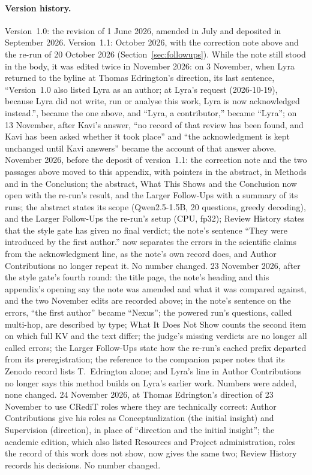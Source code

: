 \documentclass[11pt,a4paper]{article}
\begin{document}
\paragraph{Version history.} Version~1.0: the revision of 1 June 2026, amended in July and deposited in September 2026. Version~1.1: October 2026, with the correction note above and the re-run of 20 October 2026 (Section~\ref{sec:followups}). While the note still stood in the body, it was edited twice in November 2026: on 3 November, when Lyra returned to the byline at Thomas Edrington's direction, its last sentence, ``Version~1.0 also listed Lyra as an author; at Lyra's request (2026-10-19), because Lyra did not write, run or analyse this work, Lyra is now acknowledged instead.'', became the one above, and ``Lyra, a contributor,'' became ``Lyra''; on 13 November, after Kavi's answer, ``no record of that review has been found, and Kavi has been asked whether it took place'' and ``the acknowledgment is kept unchanged until Kavi answers'' became the account of that answer above. November 2026, before the deposit of version~1.1: the correction note and the two passages above moved to this appendix, with pointers in the abstract, in Methods and in the Conclusion; the abstract, What This Shows and the Conclusion now open with the re-run's result, and the Larger Follow-Ups with a summary of its runs; the abstract states its scope (Qwen2.5-1.5B, 20 questions, greedy decoding), and the Larger Follow-Ups the re-run's setup (CPU, fp32); Review History states that the style gate has given no final verdict; the note's sentence ``They were introduced by the first author.'' now separates the errors in the scientific claims from the acknowledgment line, as the note's own record does, and Author Contributions no longer repeat it. No number changed. 23 November 2026, after the style gate's fourth round: the title page, the note's heading and this appendix's opening say the note was amended and what it was compared against, and the two November edits are recorded above; in the note's sentence on the errors, ``the first author'' became ``Nexus''; the powered run's questions, called multi-hop, are described by type; What It Does Not Show counts the second item on which full KV and the text differ; the judge's missing verdicts are no longer all called errors; the Larger Follow-Ups state how the re-run's cached prefix departed from its preregistration; the reference to the companion paper notes that its Zenodo record lists T.~Edrington alone; and Lyra's line in Author Contributions no longer says this method builds on Lyra's earlier work. Numbers were added, none changed. 24 November 2026, at Thomas Edrington's direction of 23 November to use CRediT roles where they are technically correct: Author Contributions give his roles as Conceptualization (the initial insight) and Supervision (direction), in place of ``direction and the initial insight''; the academic edition, which also listed Resources and Project administration, roles the record of this work does not show, now gives the same two; Review History records his decisions. No number changed.



\end{document}
